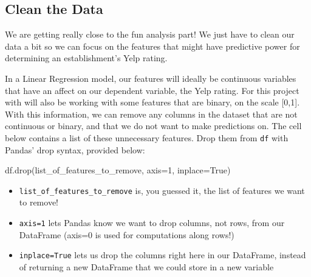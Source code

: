 \documentclass[11pt]{article}
\providecommand{\tightlist}{%
      \setlength{\itemsep}{0pt}\setlength{\parskip}{0pt}}
\newenvironment{Shaded}{}{}
\newcommand{\DecValTok}[1]{\textcolor[rgb]{0.25,0.63,0.44}{{#1}}}
\newcommand{\NormalTok}[1]{{#1}}
\newcommand{\VariableTok}[1]{\textcolor[rgb]{0.10,0.09,0.49}{{#1}}}
\newcommand{\OperatorTok}[1]{\textcolor[rgb]{0.40,0.40,0.40}{{#1}}}
\begin{document}
    \hypertarget{clean-the-data}{%
\subsection{Clean the Data}\label{clean-the-data}}

We are getting really close to the fun analysis part! We just have to
clean our data a bit so we can focus on the features that might have
predictive power for determining an establishment's Yelp rating.

In a Linear Regression model, our features will ideally be continuous
variables that have an affect on our dependent variable, the Yelp
rating. For this project with will also be working with some features
that are binary, on the scale {[}0,1{]}. With this information, we can
remove any columns in the dataset that are not continuous or binary, and
that we do not want to make predictions on. The cell below contains a
list of these unnecessary features. Drop them from \texttt{df} with
Pandas' drop syntax, provided below:

\begin{Shaded}
\begin{Highlighting}[]
\NormalTok{df.drop(list_of_features_to_remove, axis}\OperatorTok{=}\DecValTok{1}\NormalTok{, inplace}\OperatorTok{=}\VariableTok{True}\NormalTok{)}
\end{Highlighting}
\end{Shaded}

\begin{itemize}
\tightlist
\item
  \texttt{list\_of\_features\_to\_remove} is, you guessed it, the list
  of features we want to remove!
\item
  \texttt{axis=1} lets Pandas know we want to drop columns, not rows,
  from our DataFrame (axis=0 is used for computations along rows!)
\item
  \texttt{inplace=True} lets us drop the columns right here in our
  DataFrame, instead of returning a new DataFrame that we could store in
  a new variable
\end{itemize}
\end{document}
